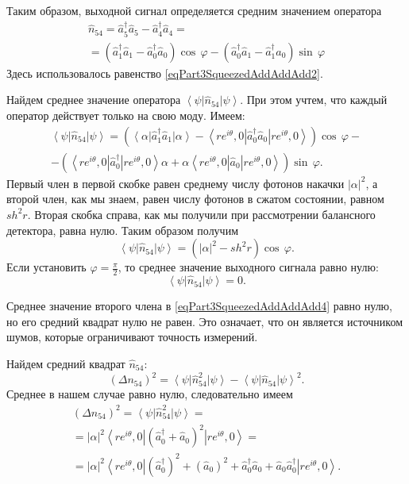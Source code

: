 Таким образом, выходной сигнал определяется средним значением оператора
\begin{eqnarray}
\hat{n}_{54} = \hat{a}_5^{\dag}\hat{a}_5 - 
\hat{a}_4^{\dag}\hat{a}_4 = 
\nonumber \\
=
\left(
\hat{a}_1^{\dag}\hat{a}_1 - 
\hat{a}_0^{\dag}\hat{a}_0
\right) \cos\,\varphi
- 
\left(
\hat{a}_0^{\dag}\hat{a}_1 - 
\hat{a}_1^{\dag}\hat{a}_0
\right) \sin\,\varphi
\end{eqnarray}
Здесь использовалось равенство \eqref{eqPart3SqueezedAddAddAdd2}.

Найдем среднее значение оператора
$\left<\psi\right|\hat{n}_{54}\left|\psi\right>$. При этом учтем, что
каждый оператор действует только на свою моду. Имеем:
\begin{eqnarray}
\left<\psi\right|\hat{n}_{54}\left|\psi\right> = 
\left(
\left<\alpha\right|\hat{a}_1^{\dag}\hat{a}_1\left|\alpha\right>
- 
\left<r e^{i\theta}, 0\right|\hat{a}_0^{\dag}\hat{a}_0\left|r
e^{i\theta}, 0\right> 
\right) \cos\,\varphi -
\nonumber \\
-
\left(
\left<r e^{i\theta}, 0\right|\hat{a}_0^{\dag}\left|r
e^{i\theta}, 0\right>\alpha +
\alpha 
\left<r e^{i\theta}, 0\right|\hat{a}_0\left|r
e^{i\theta}, 0\right>
\right) \sin\,\varphi.
\label{eqPart3SqueezedAddAddAdd4}
\end{eqnarray}
Первый член в первой скобке равен среднему числу фотонов накачки
$\left|\alpha\right|^2$, а второй член, как мы знаем, равен числу
фотонов в сжатом состоянии, равном $sh^2 r$. Вторая скобка справа, как
мы получили при рассмотрении балансного детектора, равна нулю. Таким
образом получим
\begin{equation}
\left<\psi\right|\hat{n}_{54}\left|\psi\right> = 
\left(
\left|\alpha\right|^2 - sh^2 r
\right)
\cos\,\varphi.
\nonumber
\end{equation}
Если установить $\varphi=\frac{\pi}{2}$, то среднее значение выходного
сигнала равно нулю:
\[
\left<\psi\right|\hat{n}_{54}\left|\psi\right> = 0.
\]

Среднее значение второго члена в \eqref{eqPart3SqueezedAddAddAdd4}
равно нулю, но его средний квадрат нулю не равен. Это означает, что он
является источником шумов, которые ограничивают точность измерений.

Найдем средний квадрат $\hat{n}_{54}$:
\begin{equation}
\left(\Delta n_{54}\right)^2 = 
\left<\psi\right|\hat{n}_{54}^2\left|\psi\right> -
\left<\psi\right|\hat{n}_{54}\left|\psi\right>^2.
\nonumber
\end{equation}
Среднее в нашем случае равно нулю, следовательно имеем
\begin{eqnarray}
\left(\Delta n_{54}\right)^2 = 
\left<\psi\right|\hat{n}_{54}^2\left|\psi\right> =
\nonumber \\
=
\left|\alpha\right|^2
\left<r e^{i\theta}, 0\right|
\left(\hat{a}_0^{\dag} + \hat{a}_0\right)^2
\left|r e^{i\theta}, 0\right> =
\nonumber \\
=
\left|\alpha\right|^2
\left<r e^{i\theta}, 0\right|
\left(\hat{a}_0^{\dag}\right)^2 + 
\left(\hat{a}_0\right)^2 + 
\hat{a}_0^{\dag}\hat{a}_0 +
\hat{a}_0\hat{a}_0^{\dag}
\left|r e^{i\theta}, 0\right>.
\nonumber
\end{eqnarray}

